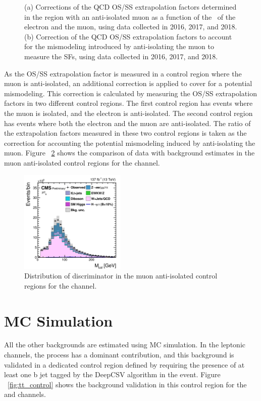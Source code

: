 \begin{figure}[htbp]
{  }
  \caption{(a) Corrections of the QCD OS/SS extrapolation factors determined in the region with an anti-isolated muon as a function of the \pt\, of the electron and the muon, using data collected in 2016, 2017, and 2018. (b) Correction of the QCD OS/SS extrapolation factors to account for the mismodeling introduced by anti-isolating the muon to measure the SFs, using data collected in 2016, 2017, and 2018.}
  \label{fig:osss_corr}
\end{figure}

As the OS/SS extrapolation factor is measured in a control region where the muon is anti-isolated, an additional correction is applied to cover for a potential mismodeling. This correction is calculated by measuring the OS/SS extrapolation factors in two different control regions. The first control region has events where the muon is isolated, and the electron is anti-isolated. The second control region has events where both the electron and the muon are anti-isolated. The ratio of the extrapolation factors measured in these two control regions is taken as the correction for accounting the potential mismodeling induced by anti-isolating the muon. Figure ~\ref{fig:qcd_control} shows the comparison of data with background estimates in the muon anti-isolated control regions for the \Hmue channel.

\begin{figure}[htbp!]
  \centering
  \includegraphics[width=0.45\textwidth]{plots/chapter7/Fake/mue/QCD.png}
  \caption{Distribution of \mcol discriminator in the muon anti-isolated control regions for the \Hmue channel.}
  \label{fig:qcd_control}
\end{figure}

\section{MC Simulation}
All the other backgrounds are estimated using MC simulation. In the leptonic channels, the \ttbar process has a dominant contribution, and this background is validated in a dedicated control region defined by requiring the presence of at least one b jet tagged by the DeepCSV algorithm in the event. Figure ~\ref{fig:tt_control} shows the background validation in this control region for the \Hmue and \Hemu channels.

